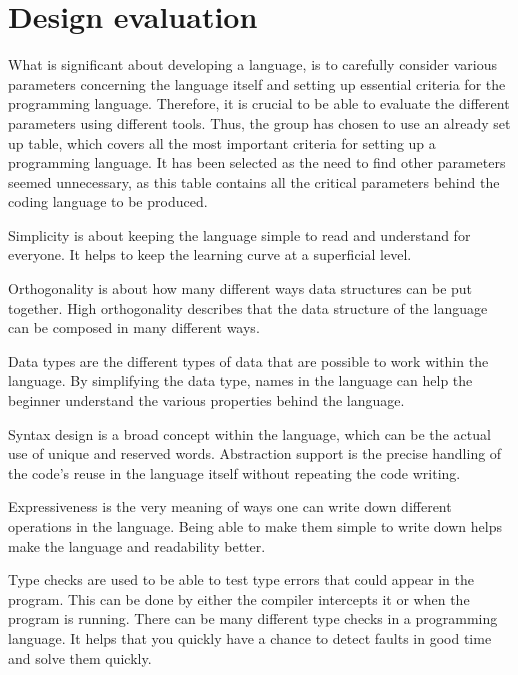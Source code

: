 \section{Design evaluation} \label{chap:design evaluation}
What is significant about developing a language, is to carefully consider various parameters concerning the language itself and setting up essential criteria for the programming language. 
Therefore, it is crucial to be able to evaluate the different parameters using different tools. Thus, the group has chosen to use an already set up table, which covers all the most important criteria for setting up a programming language. 
It has been selected as the need to find other parameters seemed unnecessary, as this table contains all the critical parameters behind the coding language to be produced.






Simplicity is about keeping the language simple to read and understand for everyone. It helps to keep the learning curve at a superficial level.

Orthogonality is about how many different ways data structures can be put together. High orthogonality describes that the data structure of the language can be composed in many different ways.

Data types are the different types of data that are possible to work within the language. By simplifying the data type, names in the language can help the beginner understand the various properties behind the language.

Syntax design is a broad concept within the language, which can be the actual use of unique and reserved words.
Abstraction support is the precise handling of the code's reuse in the language itself without repeating the code writing.

Expressiveness is the very meaning of ways one can write down different operations in the language. Being able to make them simple to write down helps make the language and readability better.

Type checks are used to be able to test type errors that could appear in the program. This can be done by either the compiler intercepts it or when the program is running. There can be many different type checks in a programming language. It helps that you quickly have a chance to detect faults in good time and solve them quickly.

